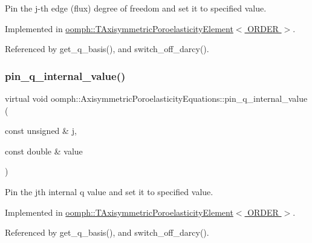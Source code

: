 Pin the j-\/th edge (flux) degree of freedom and set it to specified value. 



Implemented in \hyperlink{classoomph_1_1TAxisymmetricPoroelasticityElement_ab70396f50ef5db1cc9162637a72ae8c2}{oomph\+::\+T\+Axisymmetric\+Poroelasticity\+Element$<$ O\+R\+D\+E\+R $>$}.



Referenced by get\+\_\+q\+\_\+basis(), and switch\+\_\+off\+\_\+darcy().

\mbox{\label{classoomph_1_1AxisymmetricPoroelasticityEquations_a7d59c7c592e2c45e2cd7865295a36eed}} 
\subsubsection{\texorpdfstring{pin\+\_\+q\+\_\+internal\+\_\+value()}{pin\_q\_internal\_value()}}
{\footnotesize\ttfamily virtual void oomph\+::\+Axisymmetric\+Poroelasticity\+Equations\+::pin\+\_\+q\+\_\+internal\+\_\+value (\begin{DoxyParamCaption}\item[{const unsigned \&}]{j,  }\item[{const double \&}]{value }\end{DoxyParamCaption})\hspace{0.3cm}{\ttfamily [pure virtual]}}



Pin the jth internal q value and set it to specified value. 



Implemented in \hyperlink{classoomph_1_1TAxisymmetricPoroelasticityElement_a8b9632f528a6ba2c049a218bc09364d1}{oomph\+::\+T\+Axisymmetric\+Poroelasticity\+Element$<$ O\+R\+D\+E\+R $>$}.



Referenced by get\+\_\+q\+\_\+basis(), and switch\+\_\+off\+\_\+darcy().

\mbox{\label{classoomph_1_1AxisymmetricPoroelasticityEquations_a1fce33a1f0ea03b3c339ad0fa531c5c5}} 
